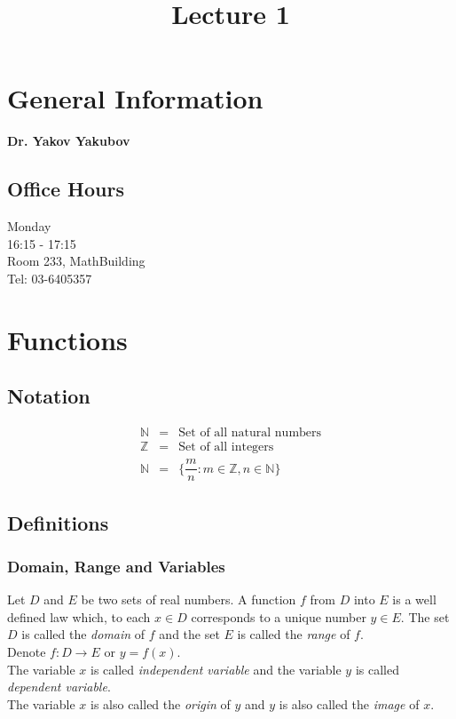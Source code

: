 \documentclass[]{article}
\title{Lecture 1}
\author{}
\date{\formatdate{28}{10}{2014}}
\begin{document}
\maketitle

\tableofcontents

\newpage
\section{General Information}

\textbf{Dr. Yakov Yakubov}

\subsection{Office Hours}

Monday\\
16:15 - 17:15\\
Room 233, MathBuilding\\
Tel: 03-6405357\\

\newpage
\section{Functions}

\subsection{Notation}

\begin{eqnarray}
\mathbb{N} &=& \text{Set of all natural numbers}\\
\mathbb{Z} &=& \text{Set of all integers}\\
\mathbb{N} &=& \{\dfrac{m}{n} : m \in \mathbb{Z}, n \in \mathbb{N}\}
\end{eqnarray}

\subsection{Definitions}

\subsubsection{Domain, Range and Variables}

Let $D$ and $E$ be two sets of real numbers. A function $f$ from $D$ into $E$ is a well defined law which, to each $x \in D$ corresponds to a unique number $y \in E$. The set $D$ is called the \emph{domain} of $f$ and the set $E$ is called the \emph{range} of $f$. \\
Denote $f : D \rightarrow E$ or $y = f(x)$. \\
The variable $x$ is called \emph{independent variable} and the variable $y$ is called \emph{dependent variable}. \\
The variable $x$ is also called the \emph{origin} of $y$ and $y$ is also called the \emph{image} of $x$. \\
\end{document}
